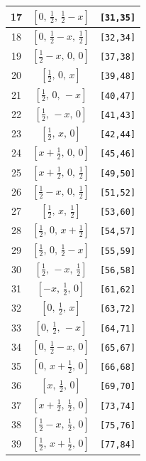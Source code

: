 \documentclass[fleqn,8pt]{jsarticle}
\begin{document}
\begin{longtable}{ccc}
17 & $\left[ 0,\, \frac{1}{2},\, \frac{1}{2} - x \right]$ & {\tt [31,35]} \\ \hline
18 & $\left[ 0,\, \frac{1}{2} - x,\, \frac{1}{2} \right]$ & {\tt [32,34]} \\ \hline
19 & $\left[ \frac{1}{2} - x,\, 0,\, 0 \right]$ & {\tt [37,38]} \\ \hline
20 & $\left[ \frac{1}{2},\, 0,\, x \right]$ & {\tt [39,48]} \\ \hline
21 & $\left[ \frac{1}{2},\, 0,\, - x \right]$ & {\tt [40,47]} \\ \hline
22 & $\left[ \frac{1}{2},\, - x,\, 0 \right]$ & {\tt [41,43]} \\ \hline
23 & $\left[ \frac{1}{2},\, x,\, 0 \right]$ & {\tt [42,44]} \\ \hline
24 & $\left[ x + \frac{1}{2},\, 0,\, 0 \right]$ & {\tt [45,46]} \\ \hline
25 & $\left[ x + \frac{1}{2},\, 0,\, \frac{1}{2} \right]$ & {\tt [49,50]} \\ \hline
26 & $\left[ \frac{1}{2} - x,\, 0,\, \frac{1}{2} \right]$ & {\tt [51,52]} \\ \hline
27 & $\left[ \frac{1}{2},\, x,\, \frac{1}{2} \right]$ & {\tt [53,60]} \\ \hline
28 & $\left[ \frac{1}{2},\, 0,\, x + \frac{1}{2} \right]$ & {\tt [54,57]} \\ \hline
29 & $\left[ \frac{1}{2},\, 0,\, \frac{1}{2} - x \right]$ & {\tt [55,59]} \\ \hline
30 & $\left[ \frac{1}{2},\, - x,\, \frac{1}{2} \right]$ & {\tt [56,58]} \\ \hline
31 & $\left[ - x,\, \frac{1}{2},\, 0 \right]$ & {\tt [61,62]} \\ \hline
32 & $\left[ 0,\, \frac{1}{2},\, x \right]$ & {\tt [63,72]} \\ \hline
33 & $\left[ 0,\, \frac{1}{2},\, - x \right]$ & {\tt [64,71]} \\ \hline
34 & $\left[ 0,\, \frac{1}{2} - x,\, 0 \right]$ & {\tt [65,67]} \\ \hline
35 & $\left[ 0,\, x + \frac{1}{2},\, 0 \right]$ & {\tt [66,68]} \\ \hline
36 & $\left[ x,\, \frac{1}{2},\, 0 \right]$ & {\tt [69,70]} \\ \hline
37 & $\left[ x + \frac{1}{2},\, \frac{1}{2},\, 0 \right]$ & {\tt [73,74]} \\ \hline
38 & $\left[ \frac{1}{2} - x,\, \frac{1}{2},\, 0 \right]$ & {\tt [75,76]} \\ \hline
39 & $\left[ \frac{1}{2},\, x + \frac{1}{2},\, 0 \right]$ & {\tt [77,84]} \\ \hline

\end{longtable}
\end{document}
